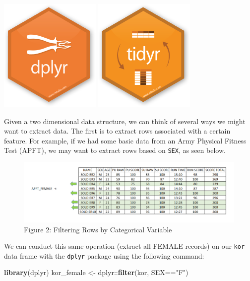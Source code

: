 \documentclass[]{book}
\newenvironment{Shaded}{\begin{snugshade}}{\end{snugshade}}
\newcommand{\KeywordTok}[1]{\textcolor[rgb]{0.13,0.29,0.53}{\textbf{{#1}}}}
\newcommand{\StringTok}[1]{\textcolor[rgb]{0.31,0.60,0.02}{{#1}}}
\newcommand{\NormalTok}[1]{{#1}}
\begin{document}
\includegraphics{dplyr.png} \includegraphics{tidyr.png}

Given a two dimensional data structure, we can think of several ways we
might want to extract data. The first is to extract rows associated with
a certain feature. For example, if we had some basic data from an Army
Physical Fitness Test (APFT), we may want to extract rows based on
\texttt{SEX}, as seen below.

\begin{figure}[htbp]
\centering
\includegraphics{filterRow.PNG}
\caption{Figure 2: Filtering Rows by Categorical Variable}
\end{figure}

We can conduct this same operation (extract all FEMALE records) on our
\texttt{kor} data frame with the \texttt{dplyr} package using the
following command:

\begin{Shaded}
\begin{Highlighting}[]
\KeywordTok{library}\NormalTok{(dplyr)}
\NormalTok{kor_female <-}\StringTok{ }\NormalTok{dplyr::}\KeywordTok{filter}\NormalTok{(kor, SEX==}\StringTok{"F"}\NormalTok{)}
\end{Highlighting}
\end{Shaded}
\end{document}
